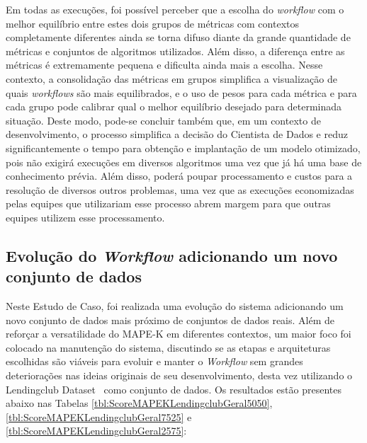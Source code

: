\documentclass{article}
\begin{document}
Em todas as execuções, foi possível perceber que a escolha do \textit{workflow} com o melhor equilíbrio entre estes dois grupos de métricas com contextos completamente diferentes ainda se torna difuso diante da grande quantidade de métricas e conjuntos de algoritmos utilizados. Além disso, a diferença entre as métricas é extremamente pequena e dificulta ainda mais a escolha. Nesse contexto, a consolidação das métricas em grupos simplifica a visualização de quais \textit{workflows} são mais equilibrados, e o uso de pesos para cada métrica e para cada grupo pode calibrar qual o melhor equilíbrio desejado para determinada situação. Deste modo, pode-se concluir também que, em um contexto de desenvolvimento, o processo simplifica a decisão do Cientista de Dados e reduz significantemente o tempo para obtenção e implantação de um modelo otimizado, pois não exigirá execuções em diversos algoritmos uma vez que já há uma base de conhecimento prévia. Além disso, poderá poupar processamento e custos para a resolução de diversos outros problemas, uma vez que as execuções economizadas pelas equipes que utilizariam esse processo abrem margem para que outras equipes utilizem esse processamento.

\subsection{Evolução do \textit{Workflow} adicionando um novo conjunto de dados}

Neste Estudo de Caso, foi realizada uma evolução do sistema adicionando um novo conjunto de dados mais próximo de conjuntos de dados reais. Além de reforçar a versatilidade do MAPE-K em diferentes contextos, um maior foco foi colocado na manutenção do sistema, discutindo se as etapas e arquiteturas escolhidas são viáveis para evoluir e manter o \textit{Workflow} sem grandes deteriorações nas ideias originais de seu desenvolvimento, desta vez utilizando o Lendingclub Dataset~\citep{lendingclub_2022} como conjunto de dados. Os resultados estão presentes abaixo nas Tabelas \ref{tbl:ScoreMAPEKLendingclubGeral5050}, \ref{tbl:ScoreMAPEKLendingclubGeral7525} e \ref{tbl:ScoreMAPEKLendingclubGeral2575}:
\end{document}
